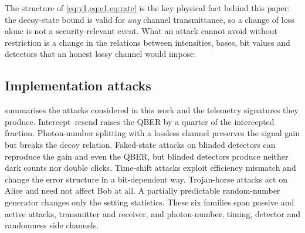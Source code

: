 \documentclass[11pt,a4paper]{article}
\theoremstyle{definition}
\theoremstyle{remark}
\begin{document}
The structure of \cref{eq:y1,eq:e1,eq:rate} is the key physical fact behind this paper: the decoy-state bound is valid for \emph{any} channel transmittance, so a change of loss alone is not a security-relevant event. What an attack cannot avoid without restriction is a change in the relations between intensities, bases, bit values and detectors that an honest lossy channel would impose.

\subsection{Implementation attacks}\label{sec:bg-attacks}

 summarises the attacks considered in this work and the telemetry signatures they produce. Intercept--resend raises the QBER by a quarter of the intercepted fraction. Photon-number splitting with a lossless channel \cite{Brassard2000} preserves the signal gain but breaks the decoy relation. Faked-state attacks on blinded detectors \cite{Lydersen2010,Gerhardt2011} can reproduce the gain and even the QBER, but blinded detectors produce neither dark counts nor double clicks. Time-shift attacks \cite{Qi2007,Zhao2008} exploit efficiency mismatch \cite{Makarov2006} and change the error structure in a bit-dependent way. Trojan-horse attacks \cite{Gisin2006THA,Lucamarini2015} act on Alice and need not affect Bob at all. A partially predictable random-number generator changes only the setting statistics. These six families span passive and active attacks, transmitter and receiver, and photon-number, timing, detector and randomness side channels.
\end{document}
